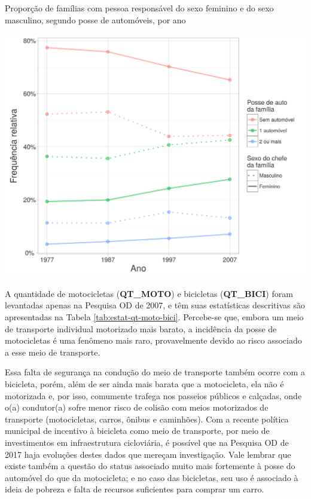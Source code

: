 \begin{grafico}[htb]%
    \caption{\label{graf:autos-sit-fam-sexo} Proporção de famílias com pessoa responsável do sexo feminino e do sexo masculino, segundo posse de automóveis, por ano}%
    \begin{center}%
        \includegraphics[width=1\textwidth]{./imagens/autos-sit-fam-sexo.png}%
    \end{center}%
\end{grafico}%

\clearpage
A quantidade de motocicletas (\textbf{QT_MOTO}) e bicicletas (\textbf{QT_BICI}) foram levantadas apenas na Pesquisa OD de 2007, e têm suas estatísticas descritivas são apresentadas na Tabela \ref{tab:estat-qt-moto-bici}.
Percebe-se que, embora um meio de transporte individual motorizado mais barato, a incidência da posse de motocicletas é uma fenômeno mais raro, provavelmente devido ao risco associado a esse meio de transporte.

Essa falta de segurança na condução do meio de transporte também ocorre com a bicicleta, porém, além de ser ainda mais barata que a motocicleta, ela não é motorizada e, por isso, comumente trafega nos passeios públicos e calçadas, onde o(a) condutor(a) sofre menor risco de colisão com meios motorizados de transporte (motocicletas, carros, ônibus e caminhões). Com a recente política municipal de incentivo à bicicleta como meio de transporte, por meio de investimentos em infraestrutura cicloviária, é possível que na Pesquisa OD de 2017 haja evoluções destes dados que mereçam investigação.
Vale lembrar que existe também a questão do status associado muito mais fortemente à posse do automóvel do que da motocicleta; e no caso das bicicletas, seu uso é associado à ideia de pobreza e falta de recursos suficientes para comprar um carro.

